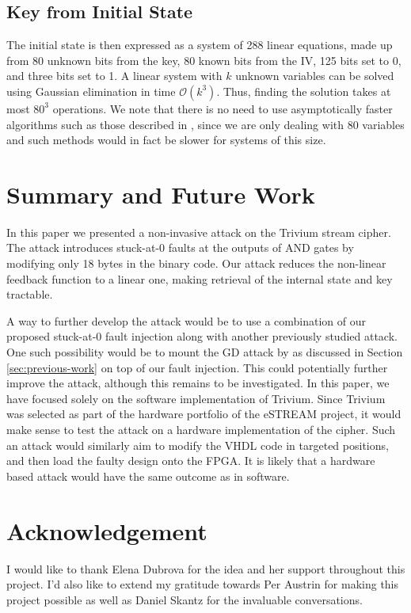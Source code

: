 \documentclass[conference]{IEEEtran}
\begin{document}
\subsection{Key from Initial State}

The initial state is then expressed as a system of 288 linear equations, made up from 80 unknown bits from the key, 80 known bits from the IV, 125 bits set to 0, and three bits set to 1. A linear system with $k$ unknown variables can be solved using Gaussian elimination in time $\mathcal{O}(k^3)$. Thus, finding the solution takes at most $80^{3}$ operations. We note that there is no need to use asymptotically faster algorithms such as those described in \cite{gauss}, since we are only dealing with 80 variables and such methods would in fact be slower for systems of this size.
 
\section{Summary and Future Work}

In this paper we presented a non-invasive attack on the Trivium stream cipher. The attack introduces stuck-at-0 faults at the outputs of AND gates by modifying only 18 bytes in the binary code. Our attack reduces the non-linear feedback function to a linear one, making retrieval of the internal state and key tractable.

A way to further develop the attack would be to use a combination of our proposed stuck-at-0 fault injection along with another previously studied attack. One such possibility would be to mount the GD attack by \cite{Rohani2010} as discussed in Section \ref{sec:previous-work} on top of our fault injection. This could potentially further improve the attack, although this remains to be investigated. In this paper, we have focused solely on the software implementation of Trivium. Since Trivium was selected as part of the hardware portfolio of the eSTREAM project, it would make sense to test the attack on a hardware implementation of the cipher. Such an attack would similarly aim to modify the VHDL code in targeted positions, and then load the faulty design onto the FPGA. It is likely that a hardware based attack would have the same outcome as in software.

\section*{Acknowledgement}

I would like to thank Elena Dubrova for the idea and her support throughout this project. I'd also like to extend my gratitude towards Per Austrin for making this project possible as well as Daniel Skantz for the invaluable conversations.



\nocite{*}
\end{document}
